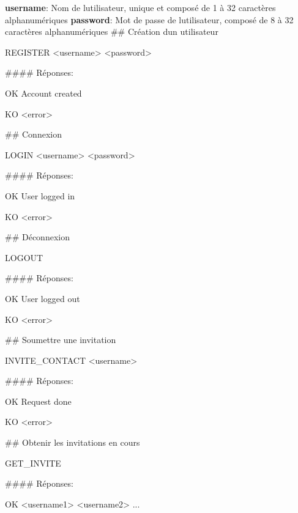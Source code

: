 {\bfseries username}\+: Nom de l\textquotesingle{}utilisateur, unique et composé de 1 à 32 caractères alphanumériques {\bfseries password}\+: Mot de passe de l\textquotesingle{}utilisateur, composé de 8 à 32 caractères alphanumériques \#\# Création d\textquotesingle{}un utilisateur 
\begin{DoxyCode}
REGISTER <username> <password>
\end{DoxyCode}
 \#\#\#\# Réponses\+: 
\begin{DoxyCode}
OK Account created
\end{DoxyCode}
 
\begin{DoxyCode}
KO <error>
\end{DoxyCode}


\#\# Connexion 
\begin{DoxyCode}
LOGIN <username> <password>
\end{DoxyCode}
 \#\#\#\# Réponses\+: 
\begin{DoxyCode}
OK User logged in
\end{DoxyCode}
 
\begin{DoxyCode}
KO <error>
\end{DoxyCode}


\#\# Déconnexion 
\begin{DoxyCode}
LOGOUT
\end{DoxyCode}
 \#\#\#\# Réponses\+: 
\begin{DoxyCode}
OK User logged out
\end{DoxyCode}
 
\begin{DoxyCode}
KO <error>
\end{DoxyCode}


\#\# Soumettre une invitation 
\begin{DoxyCode}
INVITE\_CONTACT <username>
\end{DoxyCode}
 \#\#\#\# Réponses\+: 
\begin{DoxyCode}
OK Request done
\end{DoxyCode}
 
\begin{DoxyCode}
KO <error>
\end{DoxyCode}


\#\# Obtenir les invitations en cours 
\begin{DoxyCode}
GET\_INVITE
\end{DoxyCode}
 \#\#\#\# Réponses\+: 
\begin{DoxyCode}
OK <username1> <username2> ...
\end{DoxyCode}
 
